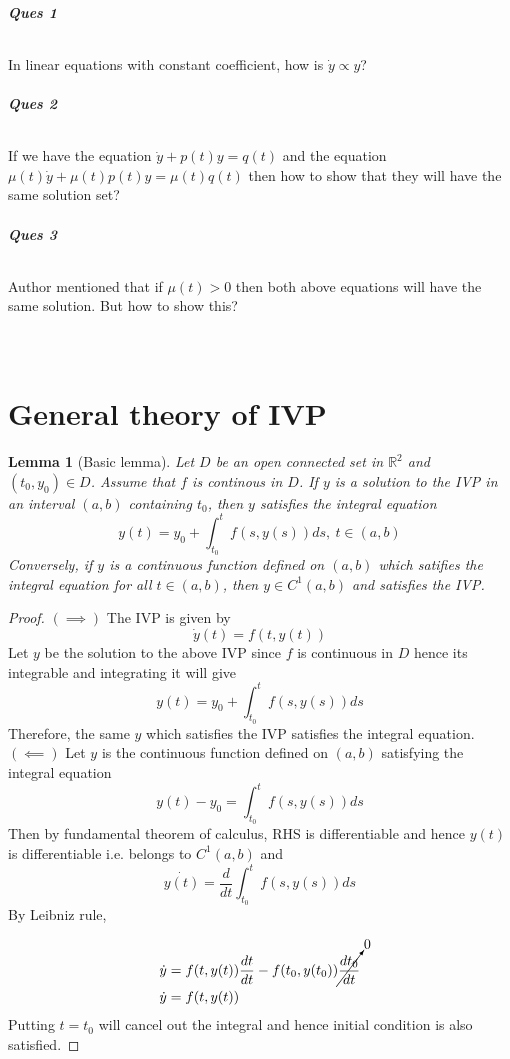 \documentclass[12pt,reqno]{amsart}
\theoremstyle{plain}
\newtheorem{lem}{Lemma}
\theoremstyle{definition}
\newcommand{\bb}[1]{\mathbb{#1}}
\begin{document}
\paragraph{\bf Ques 1} In linear equations with constant coefficient, how is $\dot{y} \propto y$?
\paragraph{\bf Ques 2} If we have the equation $\dot{y} + p(t)y = q(t)$ and the equation $\mu(t)\dot{y} + \mu(t)p(t)y = \mu(t)q(t)$ then how to show that they will have the same solution set?
\paragraph{\bf Ques 3} Author mentioned that if $\mu(t) > 0$ then both above equations will have the same solution. But how to show this?

{\large \part{\centering \\ General theory of IVP}}
\begin{lem}[Basic lemma]
    Let $D$ be an open connected set in $\bb R^2$ and $(t_0, y_0) \in D$. Assume that $f$ is continous in $D$. If $y$ is a solution to the IVP in an interval $(a,b)$ containing $t_0$, then $y$ satisfies the integral equation
    $$ y(t) = y_0 + \int_{t_0}^{t} f(s,y(s))ds,~t \in (a,b)$$
    Conversely, if $y$ is a continuous function defined on $(a,b)$ which satifies the integral equation for all $t \in (a,b)$, then $y \in C^1(a,b)$ and satisfies the IVP.
\end{lem}
\begin{proof}
    $(\implies)$ The IVP is given by
    $$ \dot{y}(t) = f(t, y(t))$$
    Let $y$ be the solution to the above IVP since $f$ is continuous in $D$ hence its integrable and integrating it will give
    $$ y(t) = y_0 + \int_{t_0}^{t} f(s,y(s)) ds$$
    Therefore, the same $y$ which satisfies the IVP satisfies the integral equation.
    $(\impliedby)$ Let $y$ is the continuous function defined on $(a,b)$ satisfying the integral equation
    $$ y(t) - y_0 = \int_{t_0}^{t} f(s, y(s))ds$$
    Then by fundamental theorem of calculus, RHS is differentiable and hence $y(t)$ is differentiable i.e. belongs to $C^1(a,b)$ and 
    $$ \dot{y(t)} = \frac{d}{dt}\int_{t_0}^{t}f(s,y(s))ds$$
    By Leibniz rule,

    \begin{align*}
        \dot{y} &= f(t,y(t)) \frac{dt}{dt} - f(t_0, y(t_0))\cancelto{0}{\frac{dt_0}{dt}} \\
        \dot{y} &= f(t,y(t))
    \end{align*}
    Putting $t = t_0$ will cancel out the integral and hence initial condition is also satisfied.
\end{proof}
\end{document}
